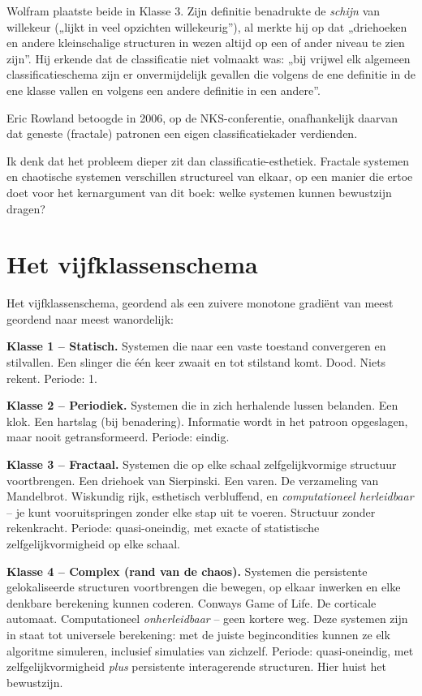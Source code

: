 \documentclass[11pt, twoside, openright]{book}
\begin{document}
Wolfram plaatste beide in Klasse 3. Zijn definitie benadrukte de \textit{schijn} van willekeur („lijkt in veel opzichten willekeurig”), al merkte hij op dat „driehoeken en andere kleinschalige structuren in wezen altijd op een of ander niveau te zien zijn”. Hij erkende dat de classificatie niet volmaakt was: „bij vrijwel elk algemeen classificatieschema zijn er onvermijdelijk gevallen die volgens de ene definitie in de ene klasse vallen en volgens een andere definitie in een andere”.

Eric Rowland betoogde in 2006, op de NKS-conferentie, onafhankelijk daarvan dat geneste (fractale) patronen een eigen classificatiekader verdienden.

Ik denk dat het probleem dieper zit dan classificatie-esthetiek. Fractale systemen en chaotische systemen verschillen structureel van elkaar, op een manier die ertoe doet voor het kernargument van dit boek: welke systemen kunnen bewustzijn dragen?

\section*{Het vijfklassenschema}

Het vijfklassenschema, geordend als een zuivere monotone gradiënt van meest geordend naar meest wanordelijk:

\textbf{Klasse 1 -- Statisch.} Systemen die naar een vaste toestand convergeren en stilvallen. Een slinger die één keer zwaait en tot stilstand komt. Dood. Niets rekent. Periode: 1.

\textbf{Klasse 2 -- Periodiek.} Systemen die in zich herhalende lussen belanden. Een klok. Een hartslag (bij benadering). Informatie wordt in het patroon opgeslagen, maar nooit getransformeerd. Periode: eindig.

\textbf{Klasse 3 -- Fractaal.} Systemen die op elke schaal zelfgelijkvormige structuur voortbrengen. Een driehoek van Sierpinski. Een varen. De verzameling van Mandelbrot. Wiskundig rijk, esthetisch verbluffend, en \textit{computationeel herleidbaar} -- je kunt vooruitspringen zonder elke stap uit te voeren. Structuur zonder rekenkracht. Periode: quasi-oneindig, met exacte of statistische zelfgelijkvormigheid op elke schaal.

\textbf{Klasse 4 -- Complex (rand van de chaos).} Systemen die persistente gelokaliseerde structuren voortbrengen die bewegen, op elkaar inwerken en elke denkbare berekening kunnen coderen. Conways Game of Life. De corticale automaat. Computationeel \textit{onherleidbaar} -- geen kortere weg. Deze systemen zijn in staat tot universele berekening: met de juiste begincondities kunnen ze elk algoritme simuleren, inclusief simulaties van zichzelf. Periode: quasi-oneindig, met zelfgelijkvormigheid \textit{plus} persistente interagerende structuren. Hier huist het bewustzijn.
\end{document}
